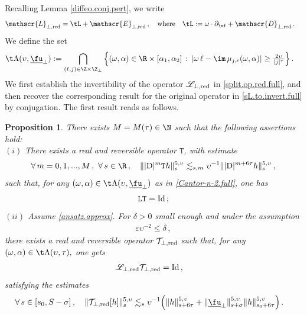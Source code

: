 \documentclass[a4paper,reqno,10pt]{article}
\newtheorem{pro}{Proposition}[section]
\newcommand{\pa}{\partial}
\newcommand{\sL}{\mathscr{L}}
\newcommand{\sE}{\mathscr{E}}
\newcommand{\sD}{\mathscr{D}}
\begin{document}
Recalling Lemma \ref{diffeo.conj.pert}, we write
\begin{equation}\label{split.op.red.full}
	\begin{aligned}
		\sL_{\perp,{\rm red}} & = \tL  + \sE_{\perp,{\rm red}}\,,\quad\textnormal{where} \quad   \tL := \omega\cdot\pa_{\vf} + \sD_{\perp,{\rm red}} \,. 
	\end{aligned}
\end{equation}
We define the set
\begin{align}\label{Cantor-n-2.full}
\t\Lambda(\upsilon,\underline{\fu}_{\perp}) &:=\bigcap_{(\ell,j)\in\Z \times \Z_{\perp} }\Big\{(\omega,\alpha)\in \R\times[\alpha_{1},\alpha_{2}]  \,: \,  | \omega\,\ell - \im \, \mu_{j,\varepsilon}(\omega,\alpha) | \geq \tfrac{2\upsilon}{ |j|^{\tau}}  \Big\}	 \,.
\end{align}
We first establish the invertibility of the operator $\sL_{\perp,{\rm red}}$ in \eqref{split.op.red.full},  and then recover the corresponding result for the original operator in \eqref{sL.to.invert.full} by conjugation.
The first result reads as follows.
\begin{pro}\label{prop-perp.full}
  There exists $M=M(\tau)\in \N$ such that the following assertions hold:
\\[1mm]
\noindent $(i)$
  There exists a real and reversible operator $\mathtt{T}$,  with  estimate
\begin{equation}\label{Est-T.full}
    \forall \,m =0,1,...,M\,, \ \forall \, s\in\R\,,\quad \||{\rm D}|^m\mathtt{T}h\|_{s}^{5,\upsilon}\lesssim_{s,m} \upsilon^{-1}\||{\rm D}|^{m+6\tau}h\|_{s}^{5,\upsilon}\,,
\end{equation}
such that,  for any $(\omega,\alpha)\in \t\Lambda(\upsilon,\underline{\fu}_{\perp})$ as in \eqref{Cantor-n-2.full},
one has
\begin{equation}\label{LT}
    \mathtt{L}\mathtt{T}={\rm Id}\,;
\end{equation}
\noindent $(ii)$ Assume \eqref{ansatz.approx}. For $\delta>0$ small enough and under the assumption
\begin{align}\label{small-second.full}
\varepsilon\upsilon^{-2}\leqslant \delta\,,
\end{align}
there exists a real and reversible operator $\mathcal{T}_{\perp,\textnormal{red}} $ such that, for  any
$(\omega,\alpha)\in\t\Lambda(\upsilon,\tau),$ one gets 
\begin{align} \label{inv.red.full}
		\sL_{\perp,{\rm red}} \mathcal{T}_{\perp,{\rm red}} & ={\rm Id}\,,
        \end{align}  
        satisfying the estimates
        \begin{align}
      \forall\, s \in [s_0,S-\sigma] \,, \quad  \| \mathcal{T}_{\perp,{\rm red}}[h]  \|_{s}^{5,\upsilon} 
      &\lesssim_{s}  \upsilon^{-1}\Big(\|h\|_{s+6\tau}^{5,\upsilon}+ \| \underline{\fu}_{\perp}\|_{s+\sigma}^{5,\upsilon} \|  h \|_{s_0+6\tau}^{5,\upsilon}\Big)\,. \label{ARI.red.est.full} 
	\end{align}
\end{pro}
\end{document}
